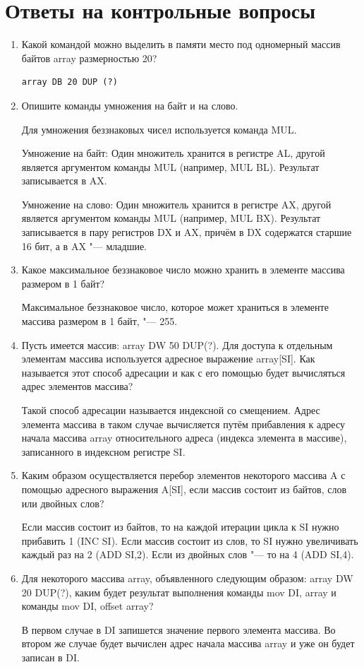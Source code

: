 \documentclass[bachelor, och, otchet]{../SCWorks}
\begin{document}
\section{Ответы на контрольные вопросы}
\begin{enumerate}
\item Какой командой можно выделить в памяти место под одномерный массив байтов array размерностью 20?

\begin{verbatim}
array DB 20 DUP (?)
\end{verbatim}

\item Опишите команды умножения на байт и на слово.

Для умножения беззнаковых чисел используется команда MUL.

Умножение на байт: Один множитель хранится в регистре AL, другой является аргументом команды MUL (например, MUL BL). Результат записывается в AX.

Умножение на слово: Один множитель хранится в регистре AX, другой является аргументом команды MUL (например, MUL BX). Результат записывается в пару регистров DX и AX, причём в DX содержатся старшие 16 бит, а в AX "--- младшие.

\item Какое максимальное беззнаковое число можно хранить в элементе массива размером в 1 байт?

Максимальное беззнаковое число, которое может храниться в элементе массива размером в 1 байт, "--- 255.

\item Пусть имеется массив: array DW 50 DUP(?). Для доступа к отдельным элементам массива используется адресное выражение array[SI]. Как называется этот способ адресации и как с его помощью будет вычисляться адрес элементов массива? 

Такой способ адресации называется индексной со смещением. Адрес элемента массива в таком случае вычисляется путём прибавления к адресу начала массива array относительного адреса (индекса элемента в массиве), записанного в индексном регистре SI.

\item Каким образом осуществляется перебор элементов некоторого массива A с помощью адресного выражения A[SI], если массив состоит из байтов, слов или двойных слов?

Если массив состоит из байтов, то на каждой итерации цикла к SI нужно прибавить 1 (INC SI). Если массив состоит из слов, то SI нужно увеличивать каждый раз на 2 (ADD SI,2). Если из двойных слов "--- то на 4 (ADD SI,4).

\item Для некоторого массива array, объявленного следующим образом: array DW 20 DUP(?), каким будет результат выполнения команды mov DI, array и команды mov DI, offset array?

В первом случае в DI запишется значение первого элемента массива. Во втором же случае будет вычислен адрес начала массива array и уже он будет записан в DI.

\end{enumerate}

\appendix
\end{document}
